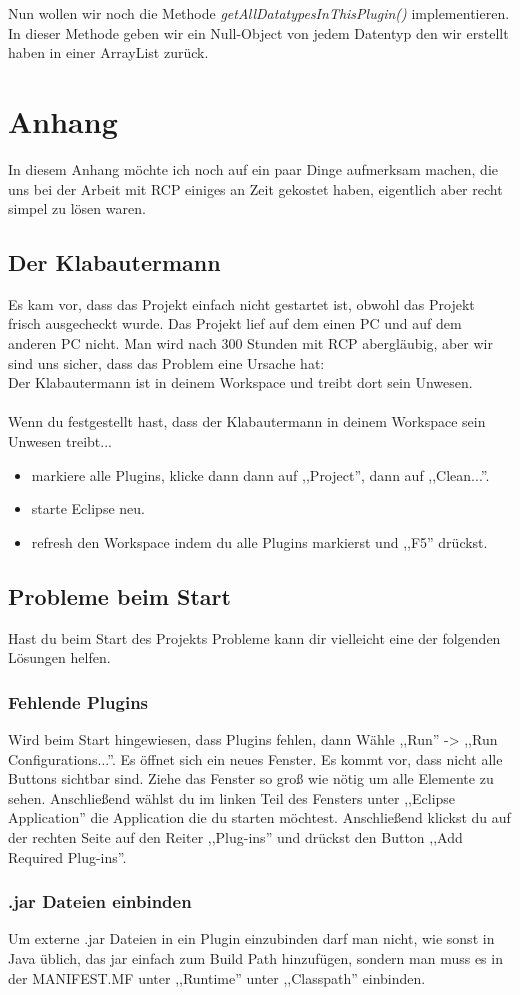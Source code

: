 \documentclass[10pt,a4paper]{article}
\begin{document}
Nun wollen wir noch die Methode \textit{getAllDatatypesInThisPlugin()} implementieren.
In dieser Methode geben wir ein Null-Object von jedem Datentyp den wir erstellt haben in einer ArrayList zurück.



\section{Anhang}
In diesem Anhang möchte ich noch auf ein paar Dinge aufmerksam machen, die uns bei der Arbeit mit RCP einiges an Zeit gekostet haben, eigentlich aber recht simpel zu lösen waren.
\subsection{Der Klabautermann}
Es kam vor, dass das Projekt einfach nicht gestartet ist, obwohl das Projekt frisch ausgecheckt wurde. Das Projekt lief auf dem einen PC und auf dem anderen PC nicht. Man wird nach 300 Stunden mit RCP abergläubig, aber wir sind uns sicher, dass das Problem eine Ursache hat: \\
Der Klabautermann ist in deinem Workspace und treibt dort sein Unwesen.\\
\\
Wenn du festgestellt hast, dass der Klabautermann in deinem Workspace sein Unwesen treibt...
\begin{itemize}
\item markiere alle Plugins, klicke dann dann auf ,,Project'',  dann auf ,,Clean...''.
\item starte Eclipse neu.
\item refresh den Workspace indem du alle Plugins markierst und ,,F5'' drückst.  
\end{itemize}
\subsection{Probleme beim Start}
Hast du beim Start des Projekts Probleme kann dir vielleicht eine der folgenden Lösungen helfen.

\subsubsection{Fehlende Plugins}
Wird beim Start hingewiesen, dass Plugins fehlen, dann Wähle ,,Run'' -> ,,Run Configurations...''. Es öffnet sich ein neues Fenster. Es kommt vor, dass nicht alle Buttons sichtbar sind. Ziehe das Fenster so groß wie nötig um alle Elemente zu sehen. Anschließend wählst du im linken Teil des Fensters unter ,,Eclipse Application'' die Application die du starten möchtest. Anschließend klickst du auf der rechten Seite auf den Reiter ,,Plug-ins'' und drückst den Button ,,Add Required Plug-ins''. 
\subsubsection{.jar Dateien einbinden}
Um externe .jar Dateien in ein Plugin einzubinden darf man nicht, wie sonst in Java üblich, das jar einfach zum Build Path hinzufügen, sondern man muss es in der MANIFEST.MF unter ,,Runtime'' unter ,,Classpath'' einbinden.

\printindex
\end{document}
